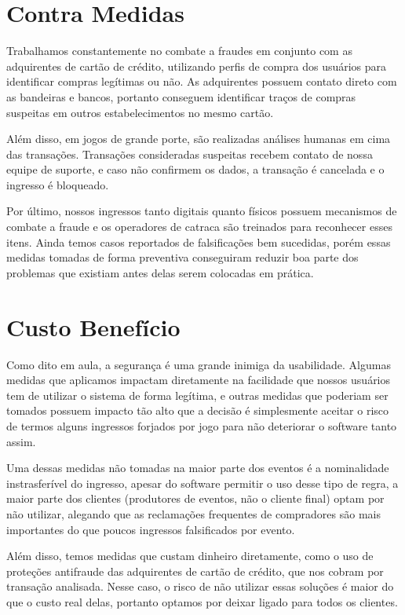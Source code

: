 \documentclass[12pt]{article}
\begin{document}
\section*{Contra Medidas}

Trabalhamos constantemente no combate a fraudes em conjunto com as adquirentes de cartão de crédito, utilizando perfis de compra dos usuários para identificar compras legítimas ou não. As adquirentes possuem contato direto com as bandeiras e bancos, portanto conseguem identificar traços de compras suspeitas em outros estabelecimentos no mesmo cartão.

Além disso, em jogos de grande porte, são realizadas análises humanas em cima das transações. Transações consideradas suspeitas recebem contato de nossa equipe de suporte, e caso não confirmem os dados, a transação é cancelada e o ingresso é bloqueado.

Por último, nossos ingressos tanto digitais quanto físicos possuem mecanismos de combate a fraude e os operadores de catraca são treinados para reconhecer esses itens. Ainda temos casos reportados de falsificações bem sucedidas, porém essas medidas tomadas de forma preventiva conseguiram reduzir boa parte dos problemas que existiam antes delas serem colocadas em prática.

\section*{Custo Benefício}

Como dito em aula, a segurança é uma grande inimiga da usabilidade. Algumas medidas que aplicamos impactam diretamente na facilidade que nossos usuários tem de utilizar o sistema de forma legítima, e outras medidas que poderiam ser tomados possuem impacto tão alto que a decisão é simplesmente aceitar o risco de termos alguns ingressos forjados por jogo para não deteriorar o software tanto assim.

Uma dessas medidas não tomadas na maior parte dos eventos é a nominalidade instrasferível do ingresso, apesar do software permitir o uso desse tipo de regra, a maior parte dos clientes (produtores de eventos, não o cliente final) optam por não utilizar, alegando que as reclamações frequentes de compradores são mais importantes do que poucos ingressos falsificados por evento.

Além disso, temos medidas que custam dinheiro diretamente, como o uso de proteções antifraude das adquirentes de cartão de crédito, que nos cobram por transação analisada. Nesse caso, o risco de não utilizar essas soluções é maior do que o custo real delas, portanto optamos por deixar ligado para todos os clientes.
\end{document}
